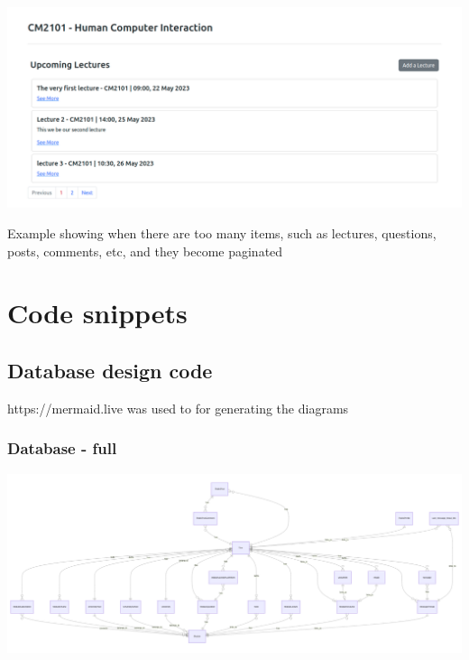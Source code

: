 \includegraphics[scale=0.27]{images/application/64 - lectures.png}

Example showing when there are too many items, such as lectures, questions, posts, comments, etc, and they become paginated





\section{Code snippets}

\subsection{Database design code}
https://mermaid.live was used to for generating the diagrams

\subsubsection{Database - full}

\includegraphics[scale=0.60, angle=90]{images/database/database_diagram.png}

